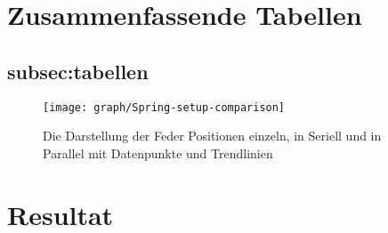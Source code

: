 \documentclass[../main.tex]{subfiles} %
\begin{document}
\section{Zusammenfassende Tabellen}\label{sec:zusammenfassende-tabellen}
    \subsection{subsec:tabellen}\label{subsec:tabellen}
    \begin{figure}[H]
        \centering
        \texttt{[image: graph/Spring-setup-comparison]}
        \caption{Die Darstellung der Feder Positionen einzeln, in Seriell und in Parallel mit Datenpunkte und Trendlinien}
        \label{fig:graph-spring-setup-comparisons}
    \end{figure}
    \section{Resultat}\label{subsec:resultat}
\end{document}
